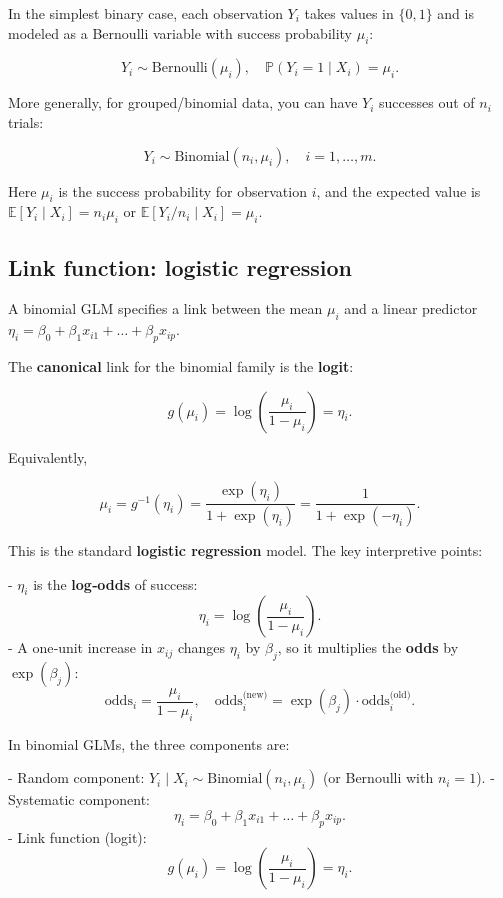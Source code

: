 In the simplest binary case, each observation $Y_i$ takes values in $\{0,1\}$ and is modeled as a Bernoulli variable with success probability $\mu_i$:

\[
Y_i \sim \text{Bernoulli}(\mu_i), \quad \mathbb{P}(Y_i = 1 \mid X_i) = \mu_i.
\]

More generally, for grouped/binomial data, you can have $Y_i$ successes out of $n_i$ trials:

\[
Y_i \sim \text{Binomial}(n_i, \mu_i), \quad i = 1,\dots,m.
\]

Here $\mu_i$ is the success probability for observation $i$, and the expected value is $\mathbb{E}[Y_i \mid X_i] = n_i \mu_i$ or $\mathbb{E}[Y_i/n_i \mid X_i] = \mu_i$.



\subsection{Link function: logistic regression}

A binomial GLM specifies a link between the mean $\mu_i$ and a linear predictor $\eta_i = \beta_0 + \beta_1 x_{i1} + \dots + \beta_p x_{ip}$.

The \textbf{canonical} link for the binomial family is the \textbf{logit}:

\[
g(\mu_i) = \log\left(\frac{\mu_i}{1 - \mu_i}\right) = \eta_i.
\]

Equivalently,

\[
\mu_i = g^{-1}(\eta_i)
= \frac{\exp(\eta_i)}{1 + \exp(\eta_i)}
= \frac{1}{1 + \exp(-\eta_i)}.
\]

This is the standard \textbf{logistic regression} model. The key interpretive points:

- $\eta_i$ is the \textbf{log‑odds} of success:
  \[
  \eta_i = \log\left(\frac{\mu_i}{1 - \mu_i}\right).
  \]
- A one‑unit increase in $x_{ij}$ changes $\eta_i$ by $\beta_j$, so it multiplies the \textbf{odds} by $\exp(\beta_j)$:
  \[
  \text{odds}_i = \frac{\mu_i}{1 - \mu_i}, \quad
  \text{odds}_i^\text{(new)} = \exp(\beta_j) \cdot \text{odds}_i^\text{(old)}.
  \]



In binomial GLMs, the three components are:

- Random component:  
  $Y_i \mid X_i \sim \text{Binomial}(n_i, \mu_i)$ (or Bernoulli with $n_i = 1$).  
- Systematic component:  
  \[
  \eta_i = \beta_0 + \beta_1 x_{i1} + \dots + \beta_p x_{ip}.
  \]
- Link function (logit):  
  \[
  g(\mu_i) = \log\left(\frac{\mu_i}{1 - \mu_i}\right) = \eta_i.
  \]

